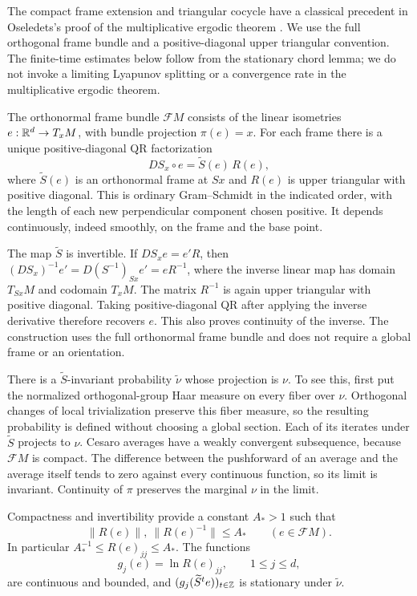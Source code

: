 The compact frame extension and triangular cocycle have a classical
precedent in Oseledets's proof of the multiplicative ergodic theorem
\cite[\S4, pp.~208--209, equations~(6)--(10)]{Oseledets1968}.
We use the full orthogonal frame bundle and a positive-diagonal upper
triangular convention. The finite-time estimates below follow from the
stationary chord lemma; we do not invoke a limiting Lyapunov splitting
or a convergence rate in the multiplicative ergodic theorem.

The orthonormal frame bundle $\mathcal F M$ consists of the linear
isometries $e:\mathbb R^d\to T_xM$, with bundle projection $\pi(e)=x$.
For each frame there is a unique positive-diagonal QR factorization
\begin{equation}\label{eq:frame-qr}
 D S_x\circ e=\widetilde S(e)\,R(e),
\end{equation}
where $\widetilde S(e)$ is an orthonormal frame at $Sx$ and $R(e)$
is upper triangular with positive diagonal.
This is ordinary Gram--Schmidt in the indicated order, with the length
of each new perpendicular component chosen positive.
It depends continuously, indeed smoothly, on the frame and the base
point.

The map $\widetilde S$ is invertible.  If
$DS_x e=e'R$, then
$(DS_x)^{-1}e'=D(S^{-1})_{Sx}e'=eR^{-1}$, where the inverse
linear map has domain $T_{Sx}M$ and codomain $T_xM$.
The matrix $R^{-1}$ is again upper triangular with
positive diagonal.  Taking positive-diagonal QR after applying the
inverse derivative therefore recovers $e$.  This also proves
continuity of the inverse.  The construction uses the full orthonormal
frame bundle and does not require a global frame or an orientation.

There is a $\widetilde S$-invariant probability $\widetilde\nu$ whose
projection is $\nu$.  To see this, first put the normalized
orthogonal-group Haar measure on every fiber over $\nu$.
Orthogonal changes of local trivialization preserve this fiber
measure, so the resulting probability is defined without choosing a
global section.  Each of its iterates under $\widetilde S$ projects
to $\nu$.  Cesaro averages have a weakly convergent subsequence,
because $\mathcal F M$ is compact.  The difference between the
pushforward of an average and the average itself tends to zero
against every continuous function, so its limit is invariant.
Continuity of $\pi$ preserves the marginal $\nu$ in the limit.

Compactness and invertibility provide a constant $A_*>1$ such that
\begin{equation}\label{eq:qr-uniform-bounds}
 \|R(e)\|,\ \|R(e)^{-1}\|\leq A_*
 \qquad(e\in\mathcal F M).
\end{equation}
In particular $A_*^{-1}\leq R(e)_{jj}\leq A_*$.
The functions
\[
 g_j(e)=\ln R(e)_{jj},\qquad 1\leq j\leq d,
\]
are continuous and bounded, and
$(g_j(\widetilde S^t e))_{t\in\mathbb Z}$ is stationary under
$\widetilde\nu$.

